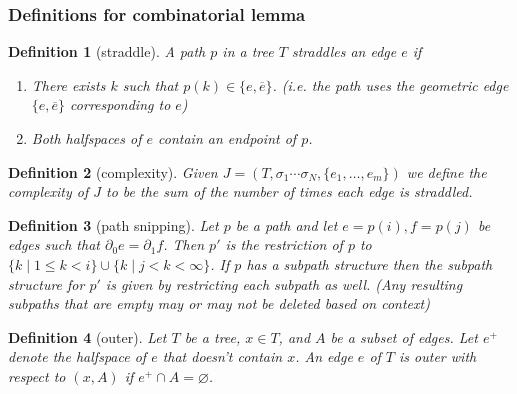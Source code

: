 \documentclass{article}
\theoremstyle{mystyle}
\newtheorem{defn}{Definition}
\theoremstyle{remark}
\begin{document}
\subsubsection{Definitions for combinatorial lemma}%
\begin{defn}
	[straddle]
	A path \(p\) in a tree \(T\) {\em straddles} an edge \(e\) if
	\begin{enumerate}
		\item There exists \(k\) such that \(p(k) \in  \{e, \overline{e}\}\). (i.e. the path uses the geometric edge \(\{e , \overline{e}\}\) corresponding to  \(e\))
		\item Both halfspaces of \(e\) contain an endpoint of \(p\).
	\end{enumerate}
\end{defn}
\begin{defn}
	[complexity]
	Given \(J=(T, \sigma_{1} \cdots \sigma_{N} , \{e_{1} , \ldots, e_{m}\})\) we define the {\em complexity} of \(J\) to be the sum of the number of times each edge is straddled.
\end{defn}
\begin{defn}
	[path snipping]
	Let \(p\) be a path and let \(e=p(i), f=p(j)\) be edges such that \(\partial_{0}  e = \partial_{1} f \). Then \(p'\) is the restriction of \(p\) to \(\{k\mid 1 \leq k < i\} \cup \{k \mid j < k < \infty\}\). If \(p\) has a subpath structure then the subpath structure for \(p'\) is given by restricting each subpath as well. (Any resulting subpaths that are empty may or may not be deleted based on context)
	
\end{defn}
\begin{defn}
	[outer]
	Let \(T\) be a tree, \(x \in T\), and \(A\) be a subset of edges. Let \(e^{+}\) denote the halfspace of \(e\) that doesn't contain \(x\). An edge \(e\) of \(T\) is {\em outer} with respect to \((x,A)\) if \(e^{+} \cap A=\varnothing\).  
\end{defn}
\end{document}
